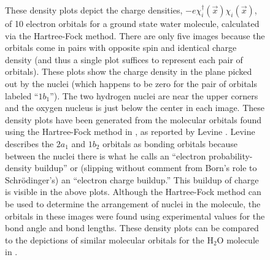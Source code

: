 \documentclass[12pt,onecolumn,secnumarabic,amsmath,amssymb,balancelastpage,nofootinbib]{article}
\begin{document}
\begin{figure}[p]
\caption{These density plots depict the charge densities, $-e\chi_i^{\dagger}(\vec{x})\chi_i(\vec{x})$, of 10 electron orbitals for a ground state water molecule, calculated via the Hartree-Fock method.  There are only five images because the orbitals come in pairs with opposite spin and identical charge density (and thus a single plot suffices to represent each pair of orbitals).  These plots show the charge density in the plane picked out by the nuclei (which happens to be zero for the pair of orbitals labeled ``$1b_1$'').  The two hydrogen nuclei are near the upper corners and the oxygen nucleus is just below the center in each image.  These density plots have been generated from the molecular orbitals found using the Hartree-Fock method in \cite{aung1968,pitzer1970}, as reported by Levine \cite[sec.\ 15.5]{levineQC}.  Levine \cite[pg.\ 452]{levineQC} describes the $2a_1$ and $1b_2$ orbitals as bonding orbitals because between the nuclei there is what he calls an ``electron probability-density buildup'' or (slipping without comment from Born's role to Schr\"{o}dinger's) an ``electron charge buildup.''  This buildup of charge is visible in the above plots.  Although the Hartree-Fock method can be used to determine the arrangement of nuclei in the molecule, the orbitals in these images were found using experimental values for the bond angle and bond lengths.  These density plots can be compared to the depictions of similar molecular orbitals for the H$_2$O molecule in \cite{dunning1972}.}
\label{waterorbitals}
\end{figure}
\end{document}
